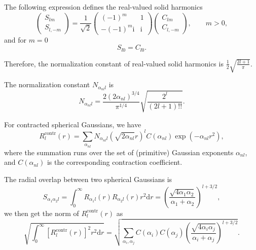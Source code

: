 \documentclass[a4paper,11pt,twoside,openright]{book}
\begin{document}
The following expression defines the real-valued solid harmonics
\begin{equation}
  \begin{pmatrix}
    S_{lm}\\
    S_{l,-m}
  \end{pmatrix}
  =\frac{1}{\sqrt{2}}
    \begin{pmatrix}
      (-1)^m & 1\\
      -(-1)^m\text{i} & \text{i}
    \end{pmatrix}
    \begin{pmatrix}
      C_{lm}\\
      C_{l,-m}
    \end{pmatrix},
    \qquad m>0,
\end{equation}
and for $m=0$
\begin{equation}
  S_{l0}=C_{l0}. 
\end{equation}

Therefore, the normalization constant of real-valued solid harmonics is $\frac{1}{2}\sqrt{\frac{2l+1}{\pi}}$.

The normalization constant $N_{\alpha_{nl}l}$ is
\begin{equation}
  N_{\alpha_{nl}l}=\frac{2(2\alpha_{nl})^{3/4}}{\pi^{1/4}}\sqrt{\frac{2^{l}}{(2l+1)!!}}.
\end{equation}

For contracted spherical Gaussians, we have
\begin{equation}
  R_{l}^\text{contr}(r)=\sum_{\alpha_{nl}}N_{\alpha_{nl}l}(\sqrt{2\alpha_{nl}}r)^{l}C(\alpha_{nl})\exp(-\alpha_{nl}r^2),
\end{equation}
where the summation runs over the set of (primitive) Gaussian exponents
$\alpha_{nl}$, and $C(\alpha_{nl})$ is the corresponding contraction coefficient.

The radial overlap between two spherical Gaussians is
\begin{equation}
  S_{\alpha_{1}\alpha_{2}l}
  =\int_{0}^{\infty}R_{\alpha_{1}l}(r)R_{\alpha_{2}l}(r)r^2\mathrm{d}r%
  =\left(\frac{\sqrt{4\alpha_{1}\alpha_{2}}}{\alpha_{1}+\alpha_{2}}\right)^{l+3/2},
\end{equation}
we then get the norm of $R_{l}^\text{contr}(r)$ as
\begin{equation}
  \sqrt{\int_{0}^{\infty}[R_{l}^\text{contr}(r)]^2r^2\mathrm{d}r}
  =\sqrt{\sum_{\alpha_{i},\alpha_{j}}C(\alpha_{i})C(\alpha_{j})%
    \left(\frac{\sqrt{4\alpha_{i}\alpha_{j}}}{\alpha_{i}+\alpha_{j}}\right)^{l+3/2}}.
\end{equation}
\end{document}
